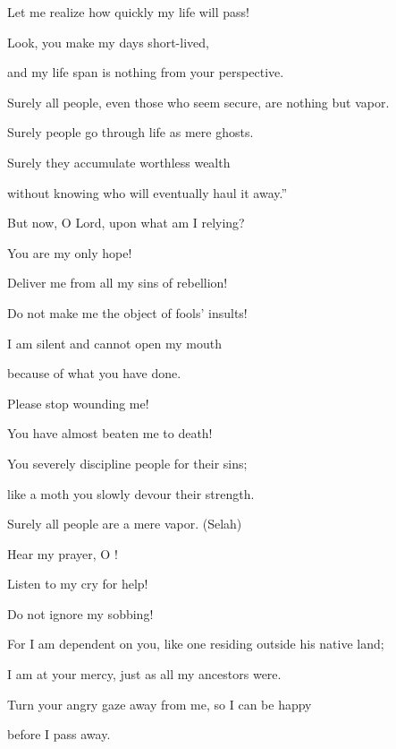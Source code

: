 {\par }{\Q Let me realize
how quickly my life will pass!
\par }{\Q {}Look,
you make
my days
short-lived,
\par }{\Q and my life span
is nothing
from your perspective.
\par }{\Q Surely
all
people,
even those who
seem secure, are nothing but vapor.
\par }{\Q {}Surely
people
go
through life as mere ghosts.
\par }{\Q Surely they accumulate
worthless
wealth
\par }{\Q without
knowing
who
will eventually haul it away.”
\par }{\Q {}But now,
O Lord,
upon what
am I relying?
\par }{\Q You are my only hope!
\par }{\Q {}Deliver
me from all
my sins of rebellion!
\par }{\Q Do not
make
me the object of
fools’
insults!
\par }{\Q {}I am silent
and cannot
open
my mouth
\par }{\Q because
of what you
have done.
\par }{\Q {}Please stop
wounding
me!

\par }{\Q You have almost beaten
me
to death!
\par }{\Q {}You severely discipline
people
for their sins;
\par }{\Q like a moth
you slowly devour
their strength.
\par }{\Q Surely
all
people
are a mere vapor.
(Selah)
\par }{\Q {}Hear
my prayer,
O
{}!
\par }{\Q Listen
to
my cry for help!
\par }{\Q Do not
ignore
my sobbing!

\par }{\Q For
I am
dependent on you, like one residing outside his native land;
\par }{\Q I am at your mercy, just as all
my ancestors were.
\par }{\Q {}Turn
your angry gaze away
from
me, so I can be happy
\par }{\Q before
I pass
away.


\par }
